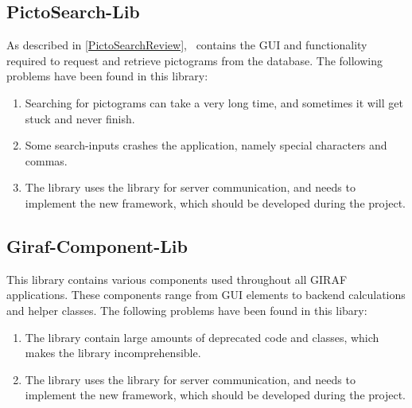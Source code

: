 \subsection{PictoSearch-Lib}
As described in \autoref{PictoSearchReview}, \plib\ contains the GUI and
functionality required to request and retrieve pictograms from the database. The
following problems have been found in this library:
\begin{enumerate}   
  \item Searching for pictograms can take a very long time,
  and sometimes it
  will get stuck and never finish.
  \item Some search-inputs crashes the application, namely special characters
  and commas.
  \item The library uses the  library for server communication, and needs
  to implement the new  framework, which should be developed during the project.
\end{enumerate}

\subsection{Giraf-Component-Lib}
This library contains various components used throughout all GIRAF applications.
These components range from GUI elements to backend calculations and helper
classes. The following problems have been found in this libary:
\begin{enumerate}
  \item The library contain large amounts of deprecated code and classes, which
  makes the library incomprehensible.
  \item The library uses the  library for server communication, and needs
  to implement the new  framework, which should be developed during the project.
\end{enumerate}